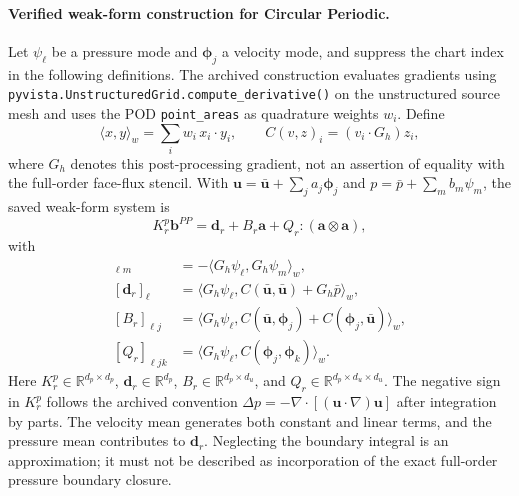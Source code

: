 \documentclass{article}
\begin{document}
\paragraph{Verified weak-form construction for Circular Periodic.}
Let $\psi_\ell$ be a pressure mode and $\bm\phi_j$ a velocity mode, and suppress the chart index in the following definitions. The archived construction evaluates gradients using \texttt{pyvista.UnstructuredGrid.compute\_derivative()} on the unstructured source mesh and uses the POD \texttt{point\_areas} as quadrature weights $w_i$. Define
\begin{equation}
 \langle x,y\rangle_w=\sum_i w_i\,x_i\cdot y_i,
 \qquad
 C(v,z)_i=(v_i\cdot G_h)z_i ,
\end{equation}
where $G_h$ denotes this post-processing gradient, not an assertion of equality with the full-order face-flux stencil. With $\bm u=\bar{\bm u}+\sum_j a_j\bm\phi_j$ and $p=\bar p+\sum_m b_m\psi_m$, the saved weak-form system is
\begin{equation}
 K_r^p\bm b^{PP}=\bm d_r+B_r\bm a+Q_r:(\bm a\otimes\bm a),
 \label{eq:app_pressure_poisson_system}
\end{equation}
with
\begin{align}
 [K_r^p]_{\ell m}&=-\langle G_h\psi_\ell,G_h\psi_m\rangle_w,
 \label{eq:app_ppe_K_definition}\\
 [\bm d_r]_\ell&=\langle G_h\psi_\ell,C(\bar{\bm u},\bar{\bm u})+G_h\bar p\rangle_w,
 \label{eq:app_ppe_d_definition}\\
 [B_r]_{\ell j}&=\langle G_h\psi_\ell,C(\bar{\bm u},\bm\phi_j)+C(\bm\phi_j,\bar{\bm u})\rangle_w,
 \label{eq:app_ppe_B_definition}\\
 [Q_r]_{\ell jk}&=\langle G_h\psi_\ell,C(\bm\phi_j,\bm\phi_k)\rangle_w.
 \label{eq:app_ppe_Q_definition}
\end{align}
Here $K_r^p\in\mathbb R^{d_p\times d_p}$, $\bm d_r\in\mathbb R^{d_p}$, $B_r\in\mathbb R^{d_p\times d_u}$, and $Q_r\in\mathbb R^{d_p\times d_u\times d_u}$. The negative sign in $K_r^p$ follows the archived convention $\Delta p=-\nabla\cdot[(\bm u\cdot\nabla)\bm u]$ after integration by parts. The velocity mean generates both constant and linear terms, and the pressure mean contributes to $\bm d_r$. Neglecting the boundary integral is an approximation; it must not be described as incorporation of the exact full-order pressure boundary closure.
\end{document}
